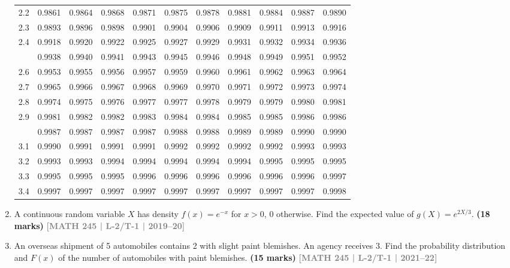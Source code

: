 \documentclass[12pt,a4paper]{article}
\newcommand{\yr}[1]{\hfill\textcolor{gray}{\small\textbf{[#1]}}}
\newcommand{\mk}[1]{\textcolor{orange!70!black}{\small\textbf{(#1 marks)}}}
\begin{document}
\begin{enumerate}
\begin{center}
\begin{longtable}{ccccccccccc}
2.2 & 0.9861 & 0.9864 & 0.9868 & 0.9871 & 0.9875 & 0.9878 & 0.9881 & 0.9884 & 0.9887 & 0.9890 \\
2.3 & 0.9893 & 0.9896 & 0.9898 & 0.9901 & 0.9904 & 0.9906 & 0.9909 & 0.9911 & 0.9913 & 0.9916 \\
2.4 & 0.9918 & 0.9920 & 0.9922 & 0.9925 & 0.9927 & 0.9929 & 0.9931 & 0.9932 & 0.9934 & 0.9936 \\
\addlinespace
2.5 & 0.9938 & 0.9940 & 0.9941 & 0.9943 & 0.9945 & 0.9946 & 0.9948 & 0.9949 & 0.9951 & 0.9952 \\
2.6 & 0.9953 & 0.9955 & 0.9956 & 0.9957 & 0.9959 & 0.9960 & 0.9961 & 0.9962 & 0.9963 & 0.9964 \\
2.7 & 0.9965 & 0.9966 & 0.9967 & 0.9968 & 0.9969 & 0.9970 & 0.9971 & 0.9972 & 0.9973 & 0.9974 \\
2.8 & 0.9974 & 0.9975 & 0.9976 & 0.9977 & 0.9977 & 0.9978 & 0.9979 & 0.9979 & 0.9980 & 0.9981 \\
2.9 & 0.9981 & 0.9982 & 0.9982 & 0.9983 & 0.9984 & 0.9984 & 0.9985 & 0.9985 & 0.9986 & 0.9986 \\
\addlinespace
3.0 & 0.9987 & 0.9987 & 0.9987 & 0.9987 & 0.9988 & 0.9988 & 0.9989 & 0.9989 & 0.9990 & 0.9990 \\
3.1 & 0.9990 & 0.9991 & 0.9991 & 0.9991 & 0.9992 & 0.9992 & 0.9992 & 0.9992 & 0.9993 & 0.9993 \\
3.2 & 0.9993 & 0.9993 & 0.9994 & 0.9994 & 0.9994 & 0.9994 & 0.9994 & 0.9995 & 0.9995 & 0.9995 \\
3.3 & 0.9995 & 0.9995 & 0.9995 & 0.9996 & 0.9996 & 0.9996 & 0.9996 & 0.9996 & 0.9996 & 0.9997 \\
3.4 & 0.9997 & 0.9997 & 0.9997 & 0.9997 & 0.9997 & 0.9997 & 0.9997 & 0.9997 & 0.9997 & 0.9998 \\
\end{longtable}
\end{center}

\item A continuous random variable $X$ has density $f(x)=e^{-x}$ for $x>0$, $0$ otherwise. Find the expected value of $g(X)=e^{2X/3}$.
\mk{18} \yr{MATH 245 | L-2/T-1 | 2019--20}

\item An overseas shipment of 5 automobiles contains 2 with slight paint blemishes. An agency receives 3. Find the probability distribution and $F(x)$ of the number of automobiles with paint blemishes.
\mk{15} \yr{MATH 245 | L-2/T-1 | 2021--22}

\end{enumerate}
\end{document}
